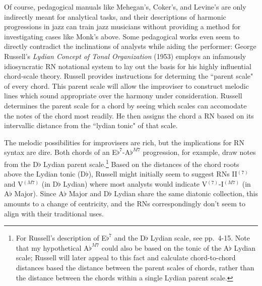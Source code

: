Of course, pedagogical manuals like Mehegan's, Coker's, and Levine's are only indirectly meant for analytical tasks, and their descriptions of harmonic progressions in jazz can train jazz musicians without providing a method for investigating cases like Monk's above.  Some pedagogical works even seem to directly contradict the inclinations of analysts while aiding the performer: George Russell's \emph{Lydian Concept of Tonal Organization} (1953) employs an infamously idiosyncratic RN notational system to lay out the basis for his highly influential chord-scale theory.  Russell provides instructions for determing the ``parent scale" of every chord.  This parent scale will allow the improviser to construct melodic lines which sound appropriate over the harmony under consideration.  Russell determines the parent scale for a chord by seeing which scales can accomodate the notes of the chord most readily.  He then assigns the chord a RN based on its intervallic distance from the ``lydian tonic" of that scale.

The melodic possibilities for improvisers are rich, but the implications for RN syntax are dire.  Both chords of an E$\flat ^7$-A$\flat^{M7}$ progression, for example, draw notes from the D$\flat$ Lydian parent scale.\footnote{For Russell's description of E$\flat^7$ and the D$\flat$ Lydian scale, see pp.\ 4-15.  Note that my hypothetical A$\flat^{M7}$ could also be based on the tonic of the A$\flat$ Lydian scale; Russell will later appeal to this fact and calculate chord-to-chord distances based the distance between the parent scales of chords, rather than the distance between the chords within a single Lydian parent scale.}  Based on the distances of the chord roots above the Lydian tonic (D$\flat$), Russell might initially seem to suggest RNs II$^{(7)}$ and V$^{(M7)}$ (in D$\flat$ Lydian) where most analysts would indicate V$^{(7)}$-I$^{(M7)}$ (in A$\flat$ Major).  Since A$\flat$ Major and D$\flat$ Lydian share the same diatonic collection, this amounts to a change of centricity, and the RNs correspondingly don't seem to align with their traditional uses.

